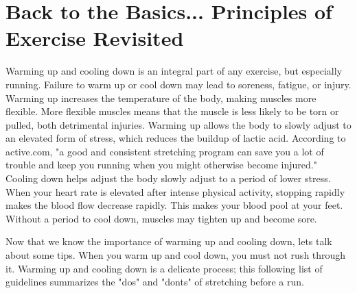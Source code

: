 \documentclass[letterpaper]{article}
\newcommand{\titleDOC}{}
\newcommand{\authorDOC}{Daniel Sabalakov}
\newcommand{\classDOC}{}
\newcommand{\quoteDOC}{``\textit{Truth is ever to be found in the simplicity, and not in the multiplicity and confusion of things}'' - Issac Newton}
\begin{document}








\renewcommand{\titleDOC}{2.1 Magazine Article}

\renewcommand{\authorDOC}{Daniel Sabalakov}

\renewcommand{\quoteDOC}{``\textit{May the Force Be With You}'' \\ \textemdash{} General Jan Dodonna}

\renewcommand{\classDOC}{PE Running}



\newpage

\section{Back to the Basics... Principles of Exercise Revisited}\label{back-to-the-basics...-principles-of-exercise-revisited}

Warming up and cooling down is an integral part of any exercise, but especially running. Failure to warm up or cool down may lead to soreness, fatigue, or injury. Warming up increases the
temperature of the body, making muscles more flexible. More flexible muscles means that the muscle is less likely to be torn or pulled, both detrimental injuries. Warming up allows the body to slowly adjust to an elevated form of stress, which reduces the buildup of lactic acid. According to active.com, "a good and consistent stretching program can save you a lot of trouble and keep you running when you might otherwise become injured." Cooling down helps adjust the body slowly adjust to a period of lower stress. When your heart rate is elevated after intense physical activity, stopping rapidly makes the blood flow decrease rapidly. This makes your blood pool at your feet. Without a period to cool down, muscles may tighten up and become sore.

Now that we know the importance of warming up and cooling down, lets talk about some tips. When you warm up and cool down, you must not rush through it. Warming up and cooling down is a delicate process; this following list of guidelines summarizes the "do\textquotesingle s" and "don\textquotesingle ts" of stretching before a run.
\end{document}

